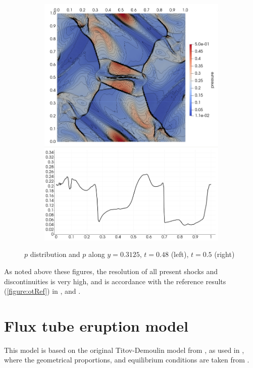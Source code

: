 \begin{figure}[H]
\begin{subfigure}[b]{0.425\textwidth}\includegraphics[width=\textwidth]{img/ot/my6.jpg}\end{subfigure}
\caption{$p$ distribution and $p$ along $y = 0.3125$, $t = 0.48$ (left), $t = 0.5$ (right)}
\label{figure:myOt3}
\end{figure}
\vspace{-3mm}

As noted above these figures, the resolution of all present shocks and discontinuities is very high, and is accordance with the reference results (\cref{figure:otRef}) in \cite{blast1}, and \cite{blast0}.

\section{Flux tube eruption model}
This model is based on the original Titov-Demoulin model from \cite{td}, as used in \cite{miraClanek}, where the geometrical proportions, and equilibrium conditions are taken from \cite{td}.
